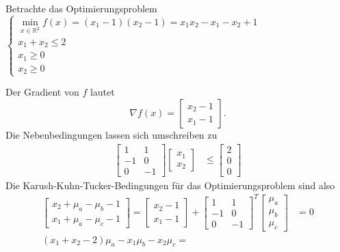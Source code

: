 
Betrachte das Optimierungsproblem $\begin{cases}\min\limits_{x\in\mathbb R^2} f(x)=(x_1-1)(x_2-1)=x_1x_2-x_1-x_2+1\\x_1+x_2\leq 2\\x_1\geq 0\\x_2\geq 0\end{cases}$\newline\newline
\begin{compactenum}[(i)]
\item Der Gradient von $f$ lautet $$\nabla f(x)=\begin{bmatrix}x_2-1\\x_1-1\end{bmatrix}.$$
Die Nebenbedingungen lassen sich umschreiben zu
\begin{align*}
\begin{bmatrix}1&1\\-1&0\\0&-1\end{bmatrix}\begin{bmatrix}x_1\\x_2\end{bmatrix}&\leq \begin{bmatrix}2\\0\\0\end{bmatrix}
\end{align*}
Die Karush-Kuhn-Tucker-Bedingungen für das Optimierungsproblem sind also
\begin{align*}\begin{bmatrix}x_2+\mu_a-\mu_b-1\\x_1+\mu_a-\mu_c-1\end{bmatrix}=\begin{bmatrix}x_2-1\\x_1-1\end{bmatrix}+\begin{bmatrix}1&1\\-1&0\\0&-1\end{bmatrix}^T\begin{bmatrix}\mu_a\\\mu_b\\\mu_c\end{bmatrix}&=0\\
(x_1+x_2-2)\mu_a-x_1\mu_b-x_2\mu_c=

\end{align*}
\end{compactenum}
